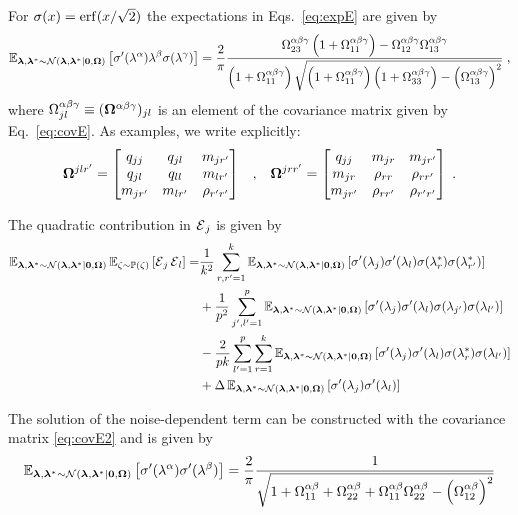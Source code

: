 For $\act(x) = \erf ( x / \sqrt{2} ) $ the expectations in Eqs.~\eqref{eq:expE} are given by \cite{saad_1995}
\begin{equation}
    \operatorname{\mathbb{E}}_{ \bm{\lambda},\bm{\lambda}^* \sim {\cal N}(\bm{\lambda},\bm{\lambda}^* |\bm{0},\bm{\Omega})}  \left[\sigma' (\lambda^\alpha ) \lambda^\beta \sigma( \lambda^\gamma )  \right] = 
    \frac{2}{\pi} \frac{ \Omega^{\alpha\beta\gamma}_{23} \left( 1+ \Omega^{\alpha\beta\gamma}_{11}\right) - \Omega^{\alpha\beta\gamma}_{12}\Omega^{\alpha\beta\gamma}_{13} }{ \left( 1+\Omega^{\alpha\beta\gamma}_{11} \right) \sqrt{\left( 1+\Omega^{\alpha\beta\gamma}_{11} \right) \left( 1+\Omega^{\alpha\beta\gamma}_{33} \right) - \left( \Omega^{\alpha\beta\gamma}_{13} \right)^2   }} \;,
\end{equation}
where $  \Omega^{\alpha\beta\gamma}_{jl} \equiv (\bm{\bm{\Omega}}^{\alpha\beta\gamma})_{jl} $ is an element of the covariance matrix given by Eq.~\eqref{eq:covE}. As examples, we write explicitly:
\begin{equation}
\bm{\bm{\Omega}}^{jl r'} = \begin{bmatrix}
q_{jj} & q_{jl} & m_{j r'} \\
q_{jl} & q_{ll} & m_{l r'} \\
m_{j r'} & m_{l r'} & \rho_{r' r'}
\end{bmatrix} \; \; \; , \; \; \; 
\bm{\bm{\Omega}}^{j r r'} = \begin{bmatrix}
q_{jj} & m_{jr} & m_{j r'} \\
m_{jr} & \rho_{rr} & \rho_{r r'} \\
m_{j r'} & \rho_{r r'} & \rho_{r' r'}
\end{bmatrix}  \;.
\end{equation}

The quadratic contribution in $\operatorname{{\cal E}}_j$ is given by
\begin{equation}
\label{eq:expEE}
\begin{split}
     \Explf \Expnoise \left[  \Er_{j} \Er_{l}  \right]  =&  
     \frac{1}{\hidt^2} \sum_{ r ,  r' =1}^{\hidt} \Explf  \left[\act' (\lf_{j}) 
     \act' (\lf_{l}) \act (\lf_{r}^*  ) \act ( \lf_{r'}^{*}  )  \right]  \\
     & + \frac{1}{\hids^2} \sum_{ j' ,  l' =1}^{\hids} \Explf  \left[\act' (\lf_{j}) 
     \act' (\lf_{l}) \act (\lf_{j'}  ) \act ( \lf_{l'}  )  \right]  \\ 
     & - \frac{2}{\hids\hidt} \sum_{ l' =1}^{\hids} \sum_{ r =1}^{\hidt} \Explf  \left[\act' (\lf_{j}) 
     \act' (\lf_{l}) \act (\lf_{r}^*  ) \act ( \lf_{l'}  )  \right]  \\
     & + \noise   \Explf  \left[\act' (\lf_{j}) 
     \act' (\lf_{l})  \right]
\end{split}
\end{equation}

The solution of the noise-dependent term can be constructed with the covariance matrix \eqref{eq:covE2} and is given by \cite{goldt_2019}
\begin{equation}
    \operatorname{\mathbb{E}}_{ \bm{\lambda},\bm{\lambda}^* \sim {\cal N}(\bm{\lambda},\bm{\lambda}^* |\bm{0},\bm{\Omega})}  \left[\sigma' (\lambda^\alpha)  \sigma' (\lambda^\beta)  \right] =  \frac{2}{\pi} 
    \frac{1}{\sqrt{ 1+ \Omega^{\alpha\beta}_{11} + \Omega^{\alpha\beta}_{22} +
    \Omega^{\alpha\beta}_{11}\Omega^{\alpha\beta}_{22} - \left( \Omega^{\alpha\beta}_{12} \right)^2   }}    
\end{equation}

